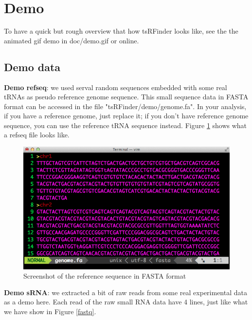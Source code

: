 \documentclass[11pt, a4paper]{article}
\begin{document}
\section{Demo}

To have a quick but rough overview that how tsRFinder looks like, see the the animated gif demo in doc/demo.gif or online.

\subsection{Demo data}

\textbf{Demo refseq}: we used serval random sequences embedded with some real tRNAs as pseudo reference genome sequence. This small sequence data in FASTA format can be accessed in the file "tsRFinder/demo/genome.fa". In your analysis, if you have a reference genome, just replace it; if you don't have reference genome sequence, you can use the reference tRNA sequence instead. Figure \ref{refseq} shows what a refseq file looks like.

\begin{figure}[htbp]
\begin{center}
\includegraphics[width=12cm]{refseq.png}
\caption{Screenshot of the reference sequence in FASTA format} 
\label{refseq}
\end{center}
\end{figure}

\textbf{Demo sRNA}: we extracted a bit of raw reads from some real experimental data as a demo here. Each read of the raw small RNA data have 4 lines, just like what we have show in Figure \ref{fastq}.
\end{document}
